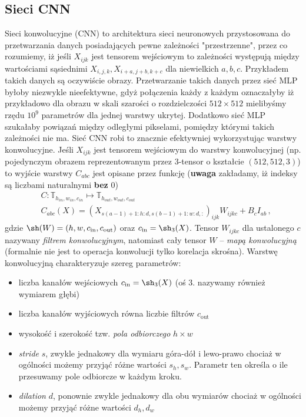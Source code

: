 \documentclass{myclass}
\begin{document}
\subsection{Sieci CNN}

Sieci konwolucyjne (CNN) to architektura sieci neuronowych przystosowana do przetwarzania danych
posiadających pewne zależności "przestrzenne", przez co rozumiemy, iż jeśli \(X_{ijk}\) jest
tensorem wejściowym to zależności występują między wartościami sąsiednimi \(X_{i,j,k},
X_{i+a,j+b,k+c}\) dla niewielkich \(a,b,c\). Przykładem takich danych są oczywiście obrazy.
Przetwarzanie takich danych przez sieć MLP byłoby niezwykle nieefektywne, gdyż połączenia każdy z
każdym oznaczałyby iż przykładowo dla obrazu w skali szarości o rozdzielczości \(512 \times 512\)
mielibyśmy rzędu \(10^9\) parametrów dla jednej warstwy ukrytej. Dodatkowo sieć MLP szukałaby
powiązań między odległymi pikselami, pomiędzy którymi takich zależności nie ma. Sieć CNN robi to
znacznie efektywniej wykorzystując warstwy konwolucyjne. Jeśli \(X_{ijk}\) jest tensorem wejściowym
do warstwy konwolucyjnej (np. pojedynczym obrazem reprezentowanym przez 3-tensor o kształcie \((512,
512, 3)\)) to wyjście warstwy \(C_{abc}\) jest opisane przez funkcję (\textbf{uwaga} zakładamy, iż
indeksy są liczbami naturalnymi \textbf{bez} 0)
\begin{equation*}
    \begin{split}
        &C: \mathbb{T}_{h_{in},w_{in},c_{in}} \mapsto \mathbb{T}_{h_{out},w_{out},c_{out}}\\
        &C_{abc}(X) = (X_{s(a-1)+1:h:d,s(b-1)+1:w:d,:})_{ijk}W_{ijkc} + B_c I_{ab}\,,    
    \end{split}
\end{equation*}
gdzie \(\sh(W) = (h, w, c_\text{in}, c_\text{out})\) oraz \(c_\text{in} = \sh_3(X)\). Tensor
\(W_{ijkc}\) dla ustalonego \(c\) nazywany \textit{filtrem konwolucyjnym}, natomiast cały tensor
\(W\) -- \textit{mapą konwolucyjną} (formalnie nie jest to operacja konwolucji tylko korelacja
skrośna). Warstwę konwolucyjną charakteryzuje szereg parametrów:
\begin{itemize}
    \item liczba kanałów wejściowych \(c_\text{in} = \sh_3(X)\) (oś 3. nazywamy również wymiarem
    głębi)
    \item liczba kanałów wyjściowych równa liczbie filtrów \(c_\text{out}\)
    \item wysokość i szerokość tzw. \textit{pola odbiorczego} \(h \times w\)
    \item \textit{stride} \(s\), zwykle jednakowy dla wymiaru góra-dół i lewo-prawo chociaż w
    ogólności możemy przyjąć różne wartości \(s_h, s_w\). Parametr ten określa o ile przesuwamy pole
    odbiorcze w każdym kroku.
    \item \textit{dilation} \(d\), ponownie zwykle jednakowy dla obu wymiarów chociaż w ogólności
    możemy przyjąć różne wartości \(d_h, d_w\)
\end{itemize}
\end{document}
